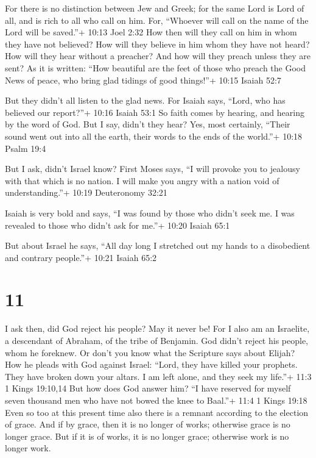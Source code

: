  For there is no distinction between Jew and Greek; for the
same Lord is Lord of all, and is rich to all who call on him.
 For, ``Whoever will call on the name of the Lord will be
saved.''+ 10:13 Joel 2:32  How then will they call on him
in whom they have not believed? How will they believe in him whom they
have not heard? How will they hear without a preacher?  And
how will they preach unless they are sent? As it is written: ``How
beautiful are the feet of those who preach the Good News of peace, who
bring glad tidings of good things!''+ 10:15 Isaiah 52:7

 But they didn't all listen to the glad news. For Isaiah
says, ``Lord, who has believed our report?''+ 10:16 Isaiah 53:1
 So faith comes by hearing, and hearing by the word of God.
 But I say, didn't they hear? Yes, most certainly, ``Their
sound went out into all the earth, their words to the ends of the
world.''+ 10:18 Psalm 19:4

 But I ask, didn't Israel know? First Moses says, ``I will
provoke you to jealousy with that which is no nation. I will make you
angry with a nation void of understanding.''+ 10:19 Deuteronomy 32:21

 Isaiah is very bold and says, ``I was found by those who
didn't seek me. I was revealed to those who didn't ask for me.''+ 10:20
Isaiah 65:1

 But about Israel he says, ``All day long I stretched out
my hands to a disobedient and contrary people.''+ 10:21 Isaiah 65:2

\hypertarget{section-10}{%
\section{11}\label{section-10}}

 I ask then, did God reject his people? May it never be! For
I also am an Israelite, a descendant of Abraham, of the tribe of
Benjamin.  God didn't reject his people, whom he foreknew.
Or don't you know what the Scripture says about Elijah? How he pleads
with God against Israel:  ``Lord, they have killed your
prophets. They have broken down your altars. I am left alone, and they
seek my life.''+ 11:3 1 Kings 19:10,14  But how does God
answer him? ``I have reserved for myself seven thousand men who have not
bowed the knee to Baal.''+ 11:4 1 Kings 19:18  Even so too
at this present time also there is a remnant according to the election
of grace.  And if by grace, then it is no longer of works;
otherwise grace is no longer grace. But if it is of works, it is no
longer grace; otherwise work is no longer work.

